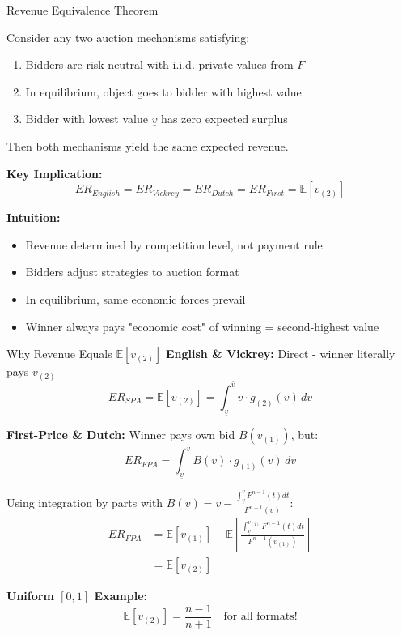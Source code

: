 \documentclass[xcolor={x11names}, aspectratio=169 ]{beamer}
\newcommand{\E}{\mathbb{E}}
\begin{document}
\begin{frame}{Revenue Equivalence Theorem}
\begin{theorem}
Consider any two auction mechanisms satisfying:
\begin{enumerate}
  \item Bidders are risk-neutral with i.i.d. private values from $F$
  \item In equilibrium, object goes to bidder with highest value
  \item Bidder with lowest value $\underline{v}$ has zero expected surplus
\end{enumerate}
Then both mechanisms yield the same expected revenue.
\end{theorem}

\textbf{Key Implication:}
$$ER_{English} = ER_{Vickrey} = ER_{Dutch} = ER_{First} = \E[v_{(2)}]$$

\textbf{Intuition:}
\begin{itemize}
  \item Revenue determined by competition level, not payment rule
  \item Bidders adjust strategies to auction format
  \item In equilibrium, same economic forces prevail
  \item Winner always pays "economic cost" of winning = second-highest value
\end{itemize}
\end{frame}

\begin{frame}{Why Revenue Equals $\E[v_{(2)}]$}
\textbf{English \& Vickrey:} Direct - winner literally pays $v_{(2)}$
$$ER_{SPA} = \E[v_{(2)}] = \int_{\underline{v}}^{\bar{v}} v \cdot g_{(2)}(v) \, dv$$

\textbf{First-Price \& Dutch:} Winner pays own bid $B(v_{(1)})$, but:
$$ER_{FPA} = \int_{\underline{v}}^{\bar{v}} B(v) \cdot g_{(1)}(v) \, dv$$

Using integration by parts with $B(v) = v - \frac{\int_{\underline{v}}^v F^{n-1}(t)dt}{F^{n-1}(v)}$:
\begin{align*}
ER_{FPA} &= \E[v_{(1)}] - \E\left[\frac{\int_{\underline{v}}^{v_{(1)}} F^{n-1}(t)dt}{F^{n-1}(v_{(1)})}\right] \\
&= \E[v_{(2)}]
\end{align*}

\textbf{Uniform $[0,1]$ Example:}
$$\E[v_{(2)}] = \frac{n-1}{n+1} \quad \text{for all formats!}$$
\end{frame}
\end{document}

